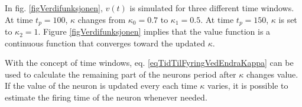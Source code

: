%



In fig. \ref{figVerdifunksjonen}, $v(t)$ is simulated for three different time windows. 
At time $t_p=100$, $\kappa$ changes from $\kappa_0=0.7$ to $\kappa_1=0.5$. 
At time $t_p=150$, $\kappa$ is set to $\kappa_2=1$. 
Figure \ref{figVerdifunksjonen} implies that the value function is a continuous function that converges toward the updated $\kappa$. %


With the concept of time windows, eq. \eqref{eqTidTilFyringVedEndraKappa} can be used to calculate the remaining part of the neurons period after $\kappa$ changes value. 
If the value of the neuron is updated every each time $\kappa$ varies, it is possible to estimate the firing time of the neuron whenever needed. %

